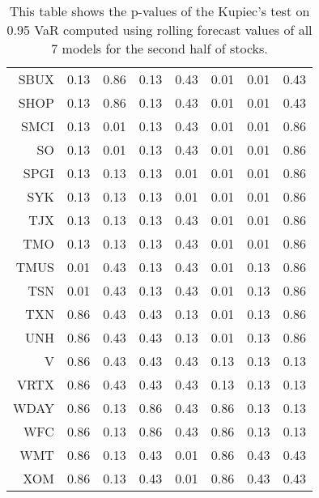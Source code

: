 \begin{table}[ht]
\begin{tabular}{rrrrrrrr}
  SBUX & 0.13 & 0.86 & 0.13 & 0.43 & 0.01 & 0.01 & 0.43 \\ 
  SHOP & 0.13 & 0.86 & 0.13 & 0.43 & 0.01 & 0.01 & 0.43 \\ 
  SMCI & 0.13 & 0.01 & 0.13 & 0.43 & 0.01 & 0.01 & 0.86 \\ 
  SO & 0.13 & 0.01 & 0.13 & 0.43 & 0.01 & 0.01 & 0.86 \\ 
  SPGI & 0.13 & 0.13 & 0.13 & 0.01 & 0.01 & 0.01 & 0.86 \\ 
  SYK & 0.13 & 0.13 & 0.13 & 0.01 & 0.01 & 0.01 & 0.86 \\ 
  TJX & 0.13 & 0.13 & 0.13 & 0.43 & 0.01 & 0.01 & 0.86 \\ 
  TMO & 0.13 & 0.13 & 0.13 & 0.43 & 0.01 & 0.01 & 0.86 \\ 
  TMUS & 0.01 & 0.43 & 0.13 & 0.43 & 0.01 & 0.13 & 0.86 \\ 
  TSN & 0.01 & 0.43 & 0.13 & 0.43 & 0.01 & 0.13 & 0.86 \\ 
  TXN & 0.86 & 0.43 & 0.43 & 0.13 & 0.01 & 0.13 & 0.86 \\ 
  UNH & 0.86 & 0.43 & 0.43 & 0.13 & 0.01 & 0.13 & 0.86 \\ 
  V & 0.86 & 0.43 & 0.43 & 0.43 & 0.13 & 0.13 & 0.13 \\ 
  VRTX & 0.86 & 0.43 & 0.43 & 0.43 & 0.13 & 0.13 & 0.13 \\ 
  WDAY & 0.86 & 0.13 & 0.86 & 0.43 & 0.86 & 0.13 & 0.13 \\ 
  WFC & 0.86 & 0.13 & 0.86 & 0.43 & 0.86 & 0.13 & 0.13 \\ 
  WMT & 0.86 & 0.13 & 0.43 & 0.01 & 0.86 & 0.43 & 0.43 \\ 
  XOM & 0.86 & 0.13 & 0.43 & 0.01 & 0.86 & 0.43 & 0.43 \\ 
   \hline
\end{tabular}
\caption[Kupiec's test p-values, alpha =0.95 (2)]{This table shows the p-values of the Kupiec's test on 0.95 VaR computed using rolling forecast values of all 7 models for the second half of stocks.} 
\label{Table:Kupiec_test_rolling_0.95_2}
\end{table}
